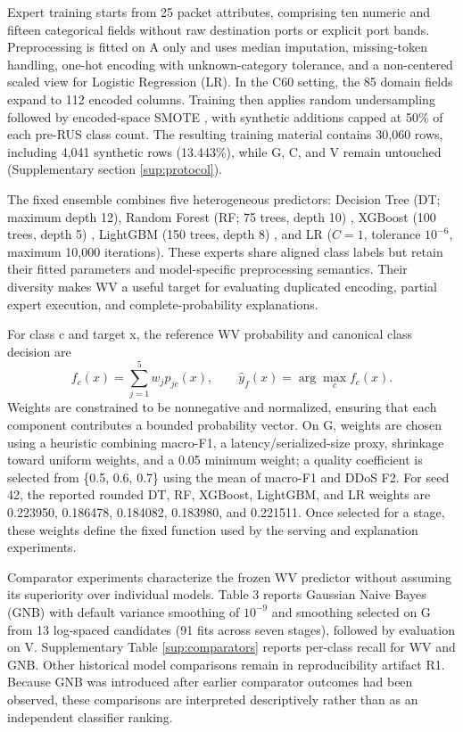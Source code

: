 \documentclass[final,3p,10pt,nopreprintline]{elsarticle}
\begin{document}
Expert training starts from 25 packet attributes, comprising ten numeric and fifteen categorical fields without raw destination ports or explicit port bands. Preprocessing is fitted on A only and uses median imputation, missing-token handling, one-hot encoding with unknown-category tolerance, and a non-centered scaled view for Logistic Regression (LR). In the C60 setting, the 85 domain fields expand to 112 encoded columns. Training then applies random undersampling followed by encoded-space SMOTE \cite{r16}, with synthetic additions capped at 50\% of each pre-RUS class count. The resulting training material contains 30,060 rows, including 4,041 synthetic rows (13.443\%), while G, C, and V remain untouched (Supplementary section \ref*{sup:protocol}).

The fixed ensemble combines five heterogeneous predictors: Decision Tree (DT; maximum depth 12), Random Forest (RF; 75 trees, depth 10) \cite{r17}, XGBoost (100 trees, depth 5) \cite{r18}, LightGBM (150 trees, depth 8) \cite{r19}, and LR (\(C=1\), tolerance \(10^{-6}\), maximum 10,000 iterations). These experts share aligned class labels but retain their fitted parameters and model-specific preprocessing semantics. Their diversity makes WV a useful target for evaluating duplicated encoding, partial expert execution, and complete-probability explanations.

For class c and target x, the reference WV probability and canonical class decision are
\begin{equation} f_c(x)=\sum_{j=1}^{5} w_jp_{jc}(x),\qquad \widehat y_f(x)=\arg\max_c f_c(x).\label{eq:vote}\end{equation}
Weights are constrained to be nonnegative and normalized, ensuring that each component contributes a bounded probability vector. On G, weights are chosen using a heuristic combining macro-F1, a latency/serialized-size proxy, shrinkage toward uniform weights, and a 0.05 minimum weight; a quality coefficient is selected from \{0.5, 0.6, 0.7\} using the mean of macro-F1 and DDoS F2. For seed 42, the reported rounded DT, RF, XGBoost, LightGBM, and LR weights are 0.223950, 0.186478, 0.184082, 0.183980, and 0.221511. Once selected for a stage, these weights define the fixed function used by the serving and explanation experiments.

Comparator experiments characterize the frozen WV predictor without assuming its superiority over individual models. Table 3 reports Gaussian Naive Bayes (GNB) \cite{r26} with default variance smoothing of \(10^{-9}\) and smoothing selected on G from 13 log-spaced candidates (91 fits across seven stages), followed by evaluation on V. Supplementary Table \ref*{sup:comparators} reports per-class recall for WV and GNB. Other historical model comparisons remain in reproducibility artifact R1. Because GNB was introduced after earlier comparator outcomes had been observed, these comparisons are interpreted descriptively rather than as an independent classifier ranking.
\end{document}
